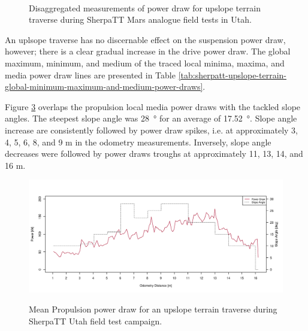 \begin{figure}[h]
\begin{subfigure}[t]{\subfigureWidth}
		\label{fig:plot:sub:sherpatt-disaggregated-upslope-terrain-power-draw-suspension}
	\end{subfigure}\\[0.8ex]
    \caption[Disaggregated measurements of power draw for upslope terrain traverse during SherpaTT Mars analogue field tests in Utah]
            {Disaggregated measurements of power draw for upslope terrain traverse during SherpaTT Mars analogue field tests in Utah.}
    \label{fig:plot:sherpatt-disaggregated-upslope-terrain-power-draw}
\vspace{-2ex}
\end{figure}

An uplsope traverse has no discernable effect on the suspension power draw, however; there is a clear gradual increase in the drive power draw. The global maximum, minimum, and medium of the traced local minima, maxima, and media power draw lines are presented in Table \ref{tab:sherpatt-upslope-terrain-global-minimum-maximum-and-medium-power-draws}.



\pagebreak
Figure \ref{fig:plot:sherpatt-upslope-terrain-power-draw} overlaps the propulsion local media power draws with the tackled slope angles. The steepest slope angle was \SI{28}{\degree} for an average of \SI{17.52}{\degree}. Slope angle increase are consistently followed by power draw spikes, i.e. at approximately 3, 4, 5, 6, 8, and 9 \si{\meter} in the odometry measurements. Inversely, slope angle decreases were followed by power draws troughs at approximately 11, 13, 14, and 16 \si{\meter}.

\begin{figure}[h]
  \centering
  \hypersetup{linkcolor=captionTextColor}
  \includegraphics[width=0.8\linewidth]{sections/design/power-budget/plots/minima-locomotion-power-draws-on-upslope-terrain.png}\\
  \caption[Mean Propulsion power draw for an upslope terrain traverse during SherpaTT Utah field test campaign.]
          {Mean Propulsion power draw for an upslope terrain traverse during SherpaTT Utah field test campaign.}
  \label{fig:plot:sherpatt-upslope-terrain-power-draw}
\end{figure}


